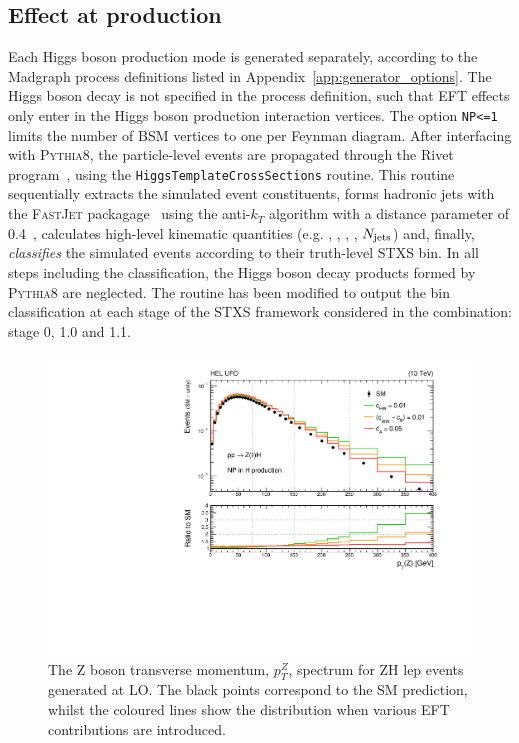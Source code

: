 \subsection{Effect at production}
Each Higgs boson production mode is generated separately, according to the Madgraph process definitions listed in Appendix~\ref{app:generator_options}. The Higgs boson decay is not specified in the process definition, such that EFT effects only enter in the Higgs boson production interaction vertices. The option \texttt{NP<=1} limits the number of BSM vertices to one per Feynman diagram. After interfacing with \textsc{Pythia8}, the particle-level events are propagated through the Rivet program~\cite{Buckley:2010ar}, using the \texttt{HiggsTemplateCrossSections} routine. This routine sequentially extracts the simulated event constituents, forms hadronic jets with the \textsc{FastJet} packagage~\cite{Cacciari:2011ma} using the anti-$k_T$ algorithm with a distance parameter of 0.4~\cite{Cacciari:2008gp}, calculates high-level kinematic quantities (e.g. \ptH, \ptV, \ptHjj, \mjj, $N_{\rm{jets}}$) and, finally, \textit{classifies} the simulated events according to their truth-level STXS bin. In all steps including the classification, the Higgs boson decay products formed by \textsc{Pythia8} are neglected. The routine has been modified to output the bin classification at each stage of the STXS framework considered in the combination: stage 0, 1.0 and 1.1.

\begin{figure}[htb!]
  \centering
  \includegraphics[width=.8\textwidth]{Figures/eft/distributions/HEL_PTZ.pdf}
  \caption[Transverse momentum of Z boson for ZH lep events with HEL contributions]
  {
    The Z boson transverse momentum, $p_T^Z$, spectrum for ZH lep events generated at LO. The black points correspond to the SM prediction, whilst the coloured lines show the distribution when various EFT contributions are introduced.
  }
  \label{fig:zhlep_ptv}
\end{figure}

